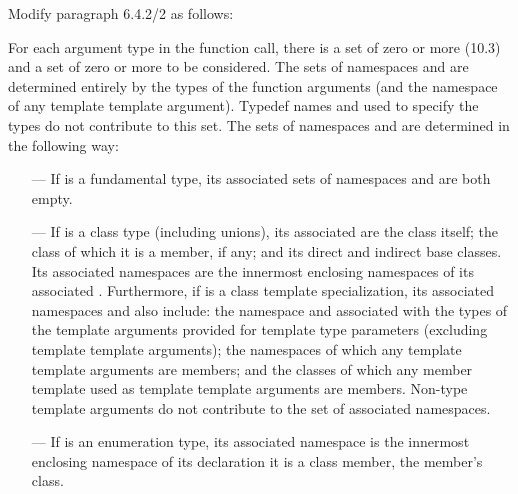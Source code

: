 \begin{extract*}
\noindent
Modify paragraph 6.4.2/2 as follows:
\begin{std.txt}
  \resetalinea[1]
  \alinea
  For each argument type  in the function call, there is a
  set of zero or more  (10.3) and a set of
  zero or more 
   to be considered.  The sets of
  namespaces and   are determined
  entirely by the types of the function arguments (and the namespace
  of any template template argument).  Typedef names and
   used to specify the types do not
  contribute to this set.  The sets of namespaces
  and   are determined in the
  following way:
  \begin{itemize}
  \item[---] If  is a fundamental type, its associated sets
  of namespaces and   are both empty.

  \item[---] If  is a class type (including unions), its
  associated   are the class itself;
  the class of which it is a member, if any; and its direct and
  indirect base classes.  Its associated namespaces are the innermost
  enclosing namespaces of its associated  .
  Furthermore, if  is a class template specialization, its
  associated namespaces and   also
  include: the namespace and  
  associated with the types of the template arguments provided for
  template type parameters (excluding template template arguments);
   the
  namespaces of which any template template arguments are members;
  and the classes of which any member template used as template
  template arguments are members. \enternote Non-type template
  arguments do not contribute to the set of associated namespaces. \exitnote

  \item[---] If  is an enumeration type, its associated
  namespace is the innermost enclosing namespace of its
  declaration it is a class member,  the member's class.


\end{itemize}
\end{std.txt}
\end{extract*}
